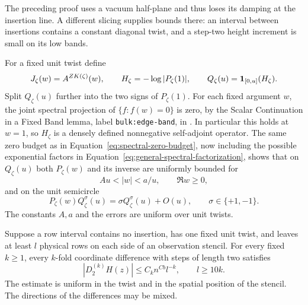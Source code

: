 The preceding proof uses a vacuum half-plane and thus loses its
damping at the insertion line.  A different slicing supplies bounds
there: an interval between insertions contains a constant diagonal
twist, and a step-two height increment is small on its low bands.

For a fixed unit twist define
\[
 J_\zeta(w)=A^{ZK(\zeta)}(w),\qquad
 H_\zeta=-\log|P_\zeta(1)|,\qquad
 Q_\zeta(u)=\mathbf 1_{[0,u]}(H_\zeta).
\]
Split $Q_\zeta(u)$ further into the two signs of $P_\zeta(1)$.
For each fixed argument $w$, the joint spectral projection of
$\{f:f(w)=0\}$ is zero, by the Scalar Continuation in a Fixed
Band lemma, label \texttt{bulk:edge-band}, in \cite{FKCompanion}.
In particular this holds at $w=1$, so $H_\zeta$ is a densely
defined nonnegative self-adjoint operator.  The same zero budget as in
Equation~\eqref{eq:spectral-zero-budget}, now including the possible
exponential factors in Equation~\eqref{eq:general-spectral-factorization},
shows that on $Q_\zeta(u)$ both $P_\zeta(w)$ and its inverse are
uniformly bounded for
\begin{equation}\label{eq:twisted-annulus}
 A u<|w|<a/u,\qquad \Re w\ge0,
\end{equation}
and on the unit semicircle
\begin{equation}\label{eq:twisted-sign}
 P_\zeta(w)Q_\zeta^\sigma(u)
 =\sigma Q_\zeta^\sigma(u)+O(u),\qquad \sigma\in\{+1,-1\}.
\end{equation}
The constants $A,a$ and the errors are uniform over unit twists.

\begin{lemma}\label{lem:twisted-differences}
Suppose a row interval contains no insertion, has one fixed unit
twist, and leaves at least $l$ physical rows on each side of an
observation stencil.  For every fixed $k\ge1$, every $k$-fold
coordinate difference with steps of length two satisfies
\begin{equation}\label{eq:twisted-derivative-bound}
 |D_2^{(k)}H(z)|\le C_k n^{Cb}l^{-k},\qquad l\ge10k.
\end{equation}
The estimate is uniform in the twist and in the spatial position of
the stencil.  The directions of the differences may be mixed.
\end{lemma}

